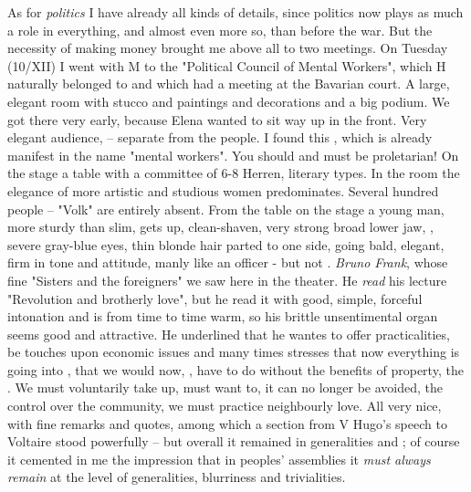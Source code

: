 As for \textit{politics} I have already  all kinds of details, since politics now plays as much a role in everything, and almost even more so, than before the war. But the necessity of making money brought me above all to two meetings. On Tuesday (10/XII) I went with M to the "Political Council of Mental Workers", which H naturally belonged to and which had a meeting at the Bavarian court. A large, elegant room with stucco and paintings and decorations and a big podium. We got there very early, because Elena wanted to sit way up in the front. Very elegant audience,  -- separate from the people. I found this , which is already manifest in the name "mental workers". You should and must be proletarian! On the stage a table with a committee of 6-8 Herren, literary types. In the room the elegance of more artistic and studious women predominates. Several hundred people -- "Volk" are entirely absent. From the table on the stage a young man, more sturdy than slim, gets up, clean-shaven, very strong broad lower jaw, , severe gray-blue eyes, thin blonde hair parted to one side, going bald, elegant, firm in tone and attitude, manly like an officer - but not . \textit{Bruno Frank}, whose fine "Sisters and the foreigners" we saw here in the theater. He \textit{read} his lecture "Revolution and brotherly love", but he read it with good, simple, forceful intonation and is from time to time warm, so his brittle unsentimental organ seems good and attractive. He underlined that he wantes to offer practicalities, be touches upon economic issues and many times stresses that now everything is going into , that we would now, , have to do without the benefits of property, the . We must voluntarily take up, must want to, it can no longer be avoided, the control over the community, we must practice neighbourly love. All very nice, with fine remarks and quotes, among which a section from V Hugo's speech to Voltaire stood powerfully -- but overall it remained in generalities and ; of course it cemented in me the impression that in peoples' assemblies it \textit{must always remain} at the level of generalities, blurriness and trivialities.

